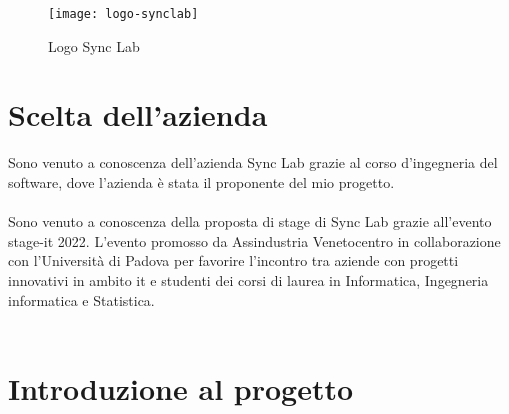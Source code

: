 \begin{figure}[H]
    \centering
    \texttt{[image: logo-synclab]}
    \caption{Logo Sync Lab}
\end{figure}

\section{Scelta dell'azienda}
Sono venuto a conoscenza dell'azienda Sync Lab grazie al corso d'ingegneria del
software, dove l'azienda è stata il proponente del mio progetto.
\\\\
Sono venuto a conoscenza della proposta di stage di Sync Lab grazie all'evento stage-it 2022. 
L’evento promosso da Assindustria Venetocentro in collaborazione con l’Università 
di Padova per favorire l’incontro tra aziende con progetti innovativi in ambito \gls{it} e 
studenti dei corsi di laurea in Informatica, Ingegneria informatica e Statistica.
\\\\


\section{Introduzione al progetto}

